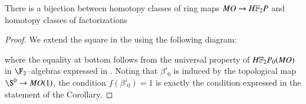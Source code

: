 \begin{corollary}\label{MOOrientationsVsRPClasses}
There is a bijection between homotopy classes of ring maps $MO \to \HFtwo P$ and homotopy classes of factorizations
\begin{center}
\end{center}
\end{corollary}
\begin{proof}
We extend the square in the  using the following diagram:
\begin{center}
\end{center}
where the equality at bottom follows from the universal property of $\HFtwo P_0(MO)$ in $\F_2$--algebras expressed in .  Noting that $\beta'_0$ is induced by the topological map $\S^0 \to MO(1)$, the condition $f(\beta'_0) = 1$ is exactly the condition expressed in the statement of the Corollary.
\end{proof}

